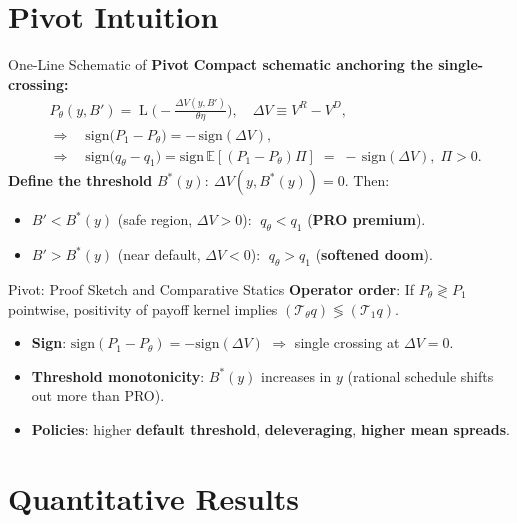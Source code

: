 \documentclass[aspectratio=169,11pt,professionalfonts]{beamer}
\newcommand{\E}{\mathbb{E}}
\newcommand{\1}{\mathbb{1}}
\DeclareMathOperator{\Lsig}{L}
\begin{document}
\section{Pivot Intuition}

\begin{frame}{One-Line Schematic of \textbf{Pivot}}
  \textbf{Compact schematic anchoring the single-crossing:}
  \begin{align*}
     & P_\theta(y,B')=\Lsig\!\Big(-\tfrac{\Delta V(y,B')}{\theta\eta}\Big),\quad \Delta V\equiv V^R{-}V^D,                                   \\
     & \Rightarrow\quad \mathrm{sign}\big( P_1{-}P_\theta\big)=-\,\mathrm{sign}(\Delta V),                                                   \\
     & \Rightarrow\quad \mathrm{sign}\big(q_\theta{-}q_1\big)=\mathrm{sign}\,\E[(P_1{-}P_\theta)\Pi]\;=\;-\,\mathrm{sign}(\Delta V),\;\Pi>0.
  \end{align*}
  \textbf{Define the threshold} $B^*(y):\ \Delta V(y,B^*(y))=0$. Then:
  \begin{itemize}
    \item \textbf{$B' < B^*(y)$} (safe region, $\Delta V>0$): $\;q_\theta<q_1$ (\textbf{PRO premium}).
    \item \textbf{$B' > B^*(y)$} (near default, $\Delta V<0$): $\;q_\theta>q_1$ (\textbf{softened doom}).
  \end{itemize}
\end{frame}

\begin{frame}{Pivot: Proof Sketch and Comparative Statics}
  \textbf{Operator order}: If $P_\theta\gtrless P_1$ pointwise, positivity of payoff kernel implies $(\mathcal T_\theta q)\lessgtr (\mathcal T_1 q)$.
  \begin{itemize}
    \item \textbf{Sign}: $\mathrm{sign}(P_1-P_\theta)=-\mathrm{sign}(\Delta V)$ $\Rightarrow$ single crossing at $\Delta V{=}0$.
    \item \textbf{Threshold monotonicity}: $B^*(y)$ increases in $y$ (rational schedule shifts out more than PRO).
    \item \textbf{Policies}: higher \textbf{default threshold}, \textbf{deleveraging}, \textbf{higher mean spreads}.
  \end{itemize}
\end{frame}

\section{Quantitative Results}
\end{document}
